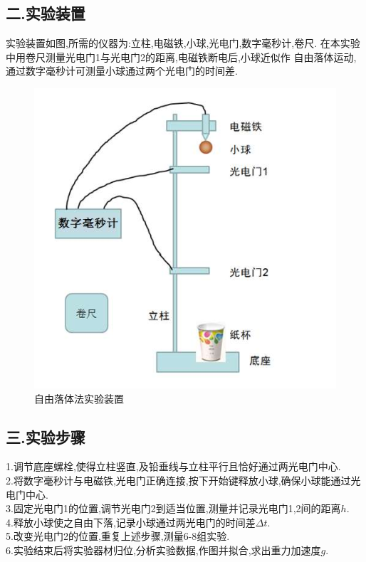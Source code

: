 \documentclass[12pt,a4paper,oneside]{ctexart}
\begin{document}
\subsection*{二.实验装置}
实验装置如图,所需的仪器为:立柱,电磁铁,小球,光电门,数字毫秒计,卷尺.
在本实验中用卷尺测量光电门1与光电门2的距离,电磁铁断电后,小球近似作
自由落体运动,通过数字毫秒计可测量小球通过两个光电门的时间差.    
\begin{figure}[H]
    \centering
    \includegraphics[scale=0.8]{zylt.png}
    \caption{自由落体法实验装置}
\end{figure}
\subsection*{三.实验步骤}\noindent
1.调节底座螺栓,使得立柱竖直,及铅垂线与立柱平行且恰好通过两光电门中心.\\
2.将数字毫秒计与电磁铁,光电门正确连接,按下开始键释放小球,确保小球能通过光电门中心.\\
3.固定光电门1的位置,调节光电门2到适当位置,测量并记录光电门1,2间的距离$h$.\\
4.释放小球使之自由下落,记录小球通过两光电门的时间差$\Delta t$.\\
5.改变光电门2的位置,重复上述步骤,测量6-8组实验.\\
6.实验结束后将实验器材归位,分析实验数据,作图并拟合,求出重力加速度$g$.
\end{document}

